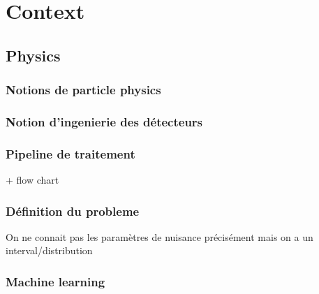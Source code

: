 
\chapter{Context}  %
\label{chap:context}
\ifpdf
    \graphicspath{{Chapter2/Figs/Raster/}{Chapter2/Figs/PDF/}{Chapter2/Figs/}}
\else
    \graphicspath{{Chapter2/Figs/Vector/}{Chapter2/Figs/}}
\fi

\section{Physics} %
\label{sec:physics}


\subsection{Notions de particle physics} %
\label{sec:notions_de_particle_physics}

\subsection{Notion d'ingenierie des détecteurs} %
\label{sec:notion_d_ingenierie_des_détecteurs}


\subsection{Pipeline de traitement} %
\label{sec:pipeline_de_traitement}

+ flow chart

\subsection{Définition du probleme} %
\label{sec:définition_du_probleme}

On ne connait pas les paramètres de nuisance précisément
mais on a un interval/distribution  


\subsection{Machine learning} %
\label{sec:machine_learning}

